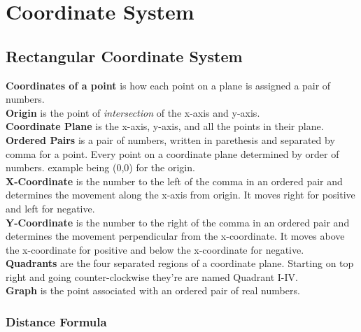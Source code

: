 \chapter{Coordinate System}
\section{Rectangular Coordinate System}
\textbf{Coordinates of a point} is how each point on a plane is assigned a pair of numbers.\\
\textbf{Origin} is the point of \textit{intersection} of the x-axis and y-axis.\\
\textbf{Coordinate Plane} is the x-axis, y-axis, and all the points in their plane.\\
\textbf{Ordered Pairs} is a pair of numbers, written in parethesis and separated by comma for a point. Every point on a coordinate plane determined by order of numbers. example being (0,0) for the origin.\\
\textbf{X-Coordinate} is the number to the left of the comma in an ordered pair and determines the movement along the x-axis from origin. It moves right for positive and left for negative.\\
\textbf{Y-Coordinate} is the number to the right of the comma in an ordered pair and determines the movement perpendicular from the x-coordinate. It moves above the x-coordinate for positive and below the x-coordinate for negative.
\\
\textbf{Quadrants} are the four separated regions of a coordinate plane. Starting on top right and going counter-clockwise they're are named Quadrant I-IV.\\
\textbf{Graph} is the point associated with an ordered pair of real numbers.

\subsection{Distance Formula}
\begin{center}

\end{center}


